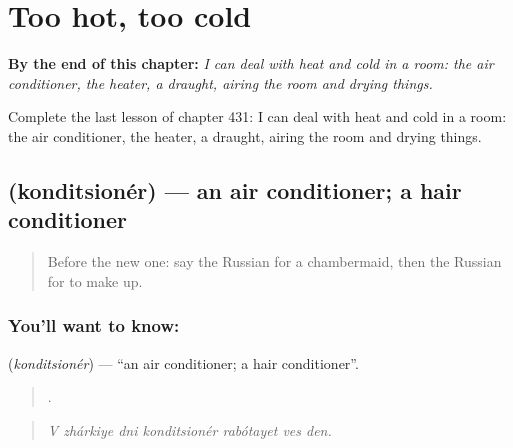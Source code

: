 
\chapter{Too hot, too cold}
\label{ch:ru-too-hot-too-cold}

\begin{chapteropening}
\textbf{By the end of this chapter:} \emph{I can deal with heat and cold in a room: the air conditioner, the heater, a draught, airing the room and drying things.}

Complete the last lesson of chapter 431: I can deal with heat and cold in a room: the air conditioner, the heater, a draught, airing the room and drying things.
\end{chapteropening}

\section[\texorpdfstring{\ru{кондиционер} (konditsionér)}{кондиционер (konditsionér)}]{ (konditsionér) — an air conditioner; a hair conditioner}

\label{lesson:RU-C431-konditsioner}



\begin{quote}
Before the new one: say the Russian for a chambermaid, then the Russian for to make up.
\end{quote}

\subsection*{You'll want to know: }
\textbf{} (\emph{konditsionér}) — \textquotedblleft{}an air conditioner; a hair conditioner\textquotedblright{}.

\begin{quote}
      .
\end{quote}

\begin{quote}
\emph{V zhárkiye dni konditsionér rabótayet ves den.}
\end{quote}

